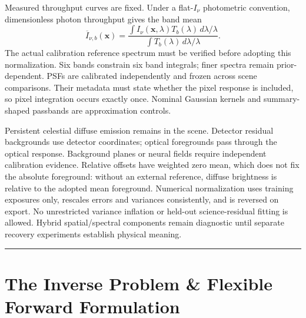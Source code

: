 \documentclass[11pt,a4paper]{article}
\begin{document}
Measured throughput curves are fixed. Under a flat-$I_\nu$ photometric convention,
dimensionless photon throughput gives the band mean
\[
\overline I_{\nu,b}(\boldsymbol{x}) =
\frac{\int I_\nu(\boldsymbol{x},\lambda)T_b(\lambda)\,d\lambda/\lambda}
     {\int T_b(\lambda)\,d\lambda/\lambda}.
\]
The actual calibration reference spectrum must be verified before adopting this
normalization. Six bands constrain six band integrals; finer spectra remain
prior-dependent. PSFs are calibrated independently and frozen across scene
comparisons. Their metadata must state whether the pixel response is included,
so pixel integration occurs exactly once. Nominal Gaussian kernels and
summary-shaped passbands are approximation controls.

Persistent celestial diffuse emission remains in the scene. Detector residual
backgrounds use detector coordinates; optical foregrounds pass through the
optical response. Background planes or neural fields require independent
calibration evidence. Relative offsets have weighted zero mean, which does not
fix the absolute foreground: without an external reference, diffuse brightness
is relative to the adopted mean foreground. Numerical normalization uses training
exposures only, rescales errors and variances consistently, and is reversed on
export. No unrestricted variance inflation or held-out science-residual fitting
is allowed. Hybrid spatial/spectral components remain diagnostic until separate
recovery experiments establish physical meaning.

\vspace{0.5em}
\hrule
\vspace{1em}

\section{The Inverse Problem \& Flexible Forward Formulation}
\end{document}

